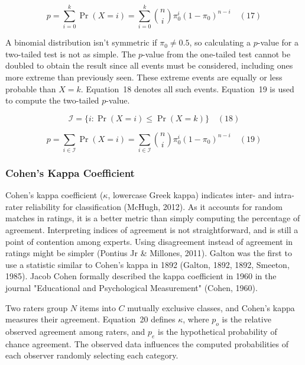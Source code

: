 \documentclass[sn-mathphys-num]{sn-jnl}%
\begin{document}
\begin{equation}
	p=\sum_{i=0}^{k}\Pr(X=i)=\sum_{i=0}^{k}{\binom{n}{i}}\pi_{0}^{i}(1-\pi_{0})^{n-i}
	\quad\left(17\right)
\end{equation}

A binomial distribution isn't symmetric if $\pi_{0}\neq 0.5$, so calculating a $p$-value for a two-tailed test is not as simple. The $p$-value from the one-tailed test cannot be doubled to obtain the result since all events must be considered, including ones more extreme than previously seen. These extreme events are equally or less probable than $X=k$. Equation~18 denotes all such events. Equation~19 is used to compute the two-tailed $p$-value.

\begin{equation}
	{\mathcal{I}}=\{i\colon \Pr(X=i)\leq \Pr(X=k)\}
	\quad\left(18\right)
\end{equation}

\begin{equation}
	p=\sum_{i\in {\mathcal{I}}}\Pr(X=i)=\sum_{i\in {\mathcal{I}}}{\binom{n}{i}}\pi_{0}^{i}(1-\pi_{0})^{n-i}
	\quad\left(19\right)
\end{equation}

\subsubsection{Cohen's Kappa Coefficient}

Cohen's kappa coefficient ($\kappa$, lowercase Greek kappa) indicates inter- and intra-rater reliability for classification (McHugh, 2012). As it accounts for random matches in ratings, it is a better metric than simply computing the percentage of agreement. Interpreting indices of agreement is not straightforward, and is still a point of contention among experts. Using disagreement instead of agreement in ratings might be simpler (Pontius Jr & Millones, 2011). Galton was the first to use a statistic similar to Cohen's kappa in 1892 (Galton, 1892, 1892, Smeeton, 1985). Jacob Cohen formally described the kappa coefficient in 1960 in the journal "Educational and Psychological Measurement" (Cohen, 1960).

Two raters group $N$ items into $C$ mutually exclusive classes, and Cohen's kappa measures their agreement. Equation~20 defines $\kappa$, where $p_{o}$ is the relative observed agreement among raters, and $p_{e}$ is the hypothetical probability of chance agreement. The observed data influences the computed probabilities of each observer randomly selecting each category.
\end{document}
